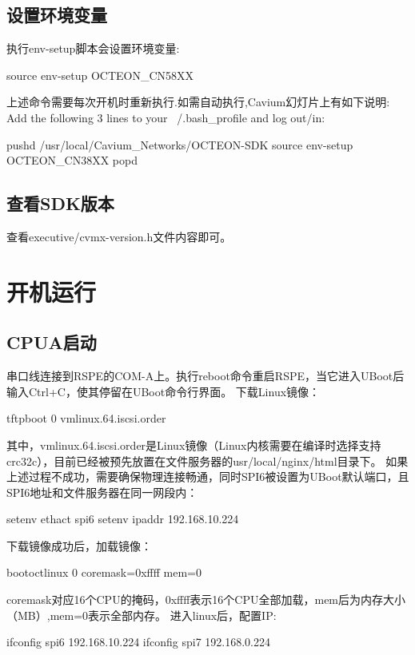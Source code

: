 \subsection{设置环境变量}
执行env-setup脚本会设置环境变量:
\begin{shellcmd}
source env-setup OCTEON_CN58XX
\end{shellcmd}
上述命令需要每次开机时重新执行.如需自动执行,Cavium幻灯片上有如下说明:
Add the following 3 lines to your ~/.bash\_profile and log out/in:
\begin{shellcmd}
pushd /usr/local/Cavium_Networks/OCTEON-SDK
source env-setup OCTEON_CN38XX
popd
\end{shellcmd}


\subsection{查看SDK版本}
查看executive/cvmx-version.h文件内容即可。

\section{开机运行}
\subsection{CPUA启动}
串口线连接到RSPE的COM-A上。执行reboot命令重启RSPE，当它进入UBoot后输入Ctrl+C，使其停留在UBoot命令行界面。
下载Linux镜像：
\begin{shellcmd}
tftpboot 0 vmlinux.64.iscsi.order
\end{shellcmd}

其中，vmlinux.64.iscsi.order是Linux镜像（Linux内核需要在编译时选择支持crc32c），目前已经被预先放置在文件服务器的usr/local/nginx/html目录下。
如果上述过程不成功，需要确保物理连接畅通，同时SPI6被设置为UBoot默认端口，且SPI6地址和文件服务器在同一网段内：
\begin{shellcmd}
setenv ethact spi6
setenv ipaddr 192.168.10.224
\end{shellcmd}

下载镜像成功后，加载镜像：
\begin{shellcmd}
bootoctlinux 0 coremask=0xffff mem=0
\end{shellcmd}

coremask对应16个CPU的掩码，0xffff表示16个CPU全部加载，mem后为内存大小（MB）,mem=0表示全部内存。
进入linux后，配置IP:
\begin{shellcmd}
ifconfig spi6 192.168.10.224
ifconfig spi7 192.168.0.224
\end{shellcmd}

